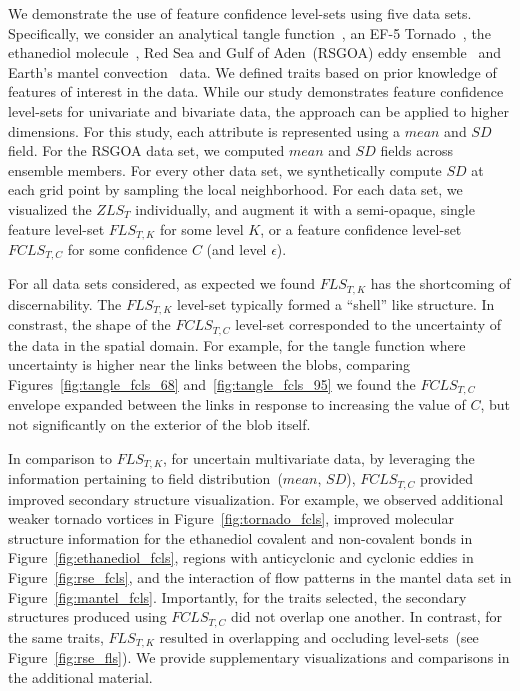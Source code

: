 
We demonstrate the use of feature confidence level-sets using five data sets.
%
Specifically, we consider an analytical tangle function~\cite{knoll2009fast}, an EF-5 Tornado~\cite{atmos10100578}, the ethanediol molecule~\cite{}, Red Sea and Gulf of Aden~(RSGOA) eddy ensemble~\cite{sanikommu2020impact} and Earth's mantel convection~\cite{shahnas2017mid} data.
%
We defined traits based on prior knowledge of features of interest in the data.
%
While our study demonstrates feature confidence level-sets for univariate and bivariate data, the approach can be applied to higher dimensions.
%
For this study, each attribute is represented using a $mean$ and $SD$ field. 
%
For the RSGOA data set, we computed $mean$ and $SD$ fields across ensemble members. 
%
For every other data set, we synthetically compute $SD$ at each grid point by sampling the local neighborhood.
%
For each data set, we visualized the $ZLS_{T}$ individually, and augment it with a semi-opaque, single feature level-set $FLS_{T,K}$ for some level $K$, or a feature confidence level-set $FCLS_{T,C}$ for some confidence $C$ (and level $\epsilon$).
%

For all data sets considered, as expected we found $FLS_{T,K}$ has the shortcoming of discernability.
%
The $FLS_{T,K}$ level-set typically formed a ``shell'' like structure.
%
In constrast, the shape of the $FCLS_{T,C}$ level-set corresponded to the uncertainty of the data in the spatial domain.
%
For example, for the tangle function where uncertainty is higher near the links between the blobs, comparing Figures~\ref{fig:tangle_fcls_68} and~\ref{fig:tangle_fcls_95} we found the $FCLS_{T,C}$ envelope expanded between the links in response to increasing the value of $C$, but not significantly on the exterior of the blob itself.

In comparison to $FLS_{T,K}$, for uncertain multivariate data, by leveraging the information pertaining to field distribution~($mean$, $SD$), $FCLS_{T,C}$ provided improved secondary structure visualization.
%
For example, we observed additional weaker tornado vortices in Figure~\ref{fig:tornado_fcls}, improved molecular structure information for the ethanediol covalent and non-covalent bonds in Figure~\ref{fig:ethanediol_fcls}, regions with anticyclonic and cyclonic eddies in Figure~\ref{fig:rse_fcls}, and the interaction of flow patterns in the mantel data set in Figure~\ref{fig:mantel_fcls}.
%
Importantly, for the traits selected, the secondary structures produced using $FCLS_{T,C}$ did not overlap one another.
%
In contrast, for the same traits, $FLS_{T,K}$ resulted in overlapping and occluding level-sets~(see Figure~\ref{fig:rse_fls}).
%
We provide supplementary visualizations and comparisons in the additional material. 
 




